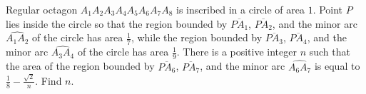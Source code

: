 Regular octagon $A_1A_2A_3A_4A_5A_6A_7A_8$ is inscribed in a circle of area $1$.  Point $P$ lies inside the circle so that the region bounded by $\overline{PA_1}$, $\overline{PA_2}$, and the minor arc $\widehat{A_1A_2}$ of the circle has area $\tfrac17$, while the region bounded by $\overline{PA_3}$, $\overline{PA_4}$, and the minor arc $\widehat{A_3A_4}$ of the circle has area $\tfrac 19$.  There is a positive integer $n$ such that the area of the region bounded by $\overline{PA_6}$, $\overline{PA_7}$, and the minor arc $\widehat{A_6A_7}$ is equal to $\tfrac18 - \tfrac{\sqrt 2}n$.  Find $n$.